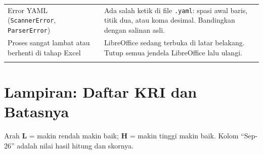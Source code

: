 \documentclass[11pt,a4paper]{article}
\newcommand{\file}[1]{\texttt{\small #1}}
\begin{document}
\begin{longtable}{>{\raggedright\arraybackslash}p{5.6cm}>{\raggedright\arraybackslash}p{9.2cm}}
\addlinespace[2pt]
Error YAML (\texttt{ScannerError}, \texttt{ParserError}) & Ada salah ketik di file \file{.yaml}: spasi awal baris, titik dua, atau koma desimal. Bandingkan dengan salinan asli. \\
\addlinespace[2pt]
Proses sangat lambat atau berhenti di tahap Excel & LibreOffice sedang terbuka di latar belakang. Tutup semua jendela LibreOffice lalu ulangi. \\
\addlinespace[2pt]
\bottomrule
\end{longtable}
\appendix
\section{Lampiran: Daftar KRI dan Batasnya}\label{sec:lampiran-kri}

Arah \textbf{L} = makin rendah makin baik; \textbf{H} = makin tinggi makin baik. Kolom ``Sep-26'' adalah nilai hasil hitung dan skornya.
\end{document}
